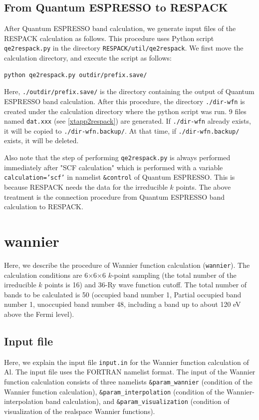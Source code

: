 \documentclass{article}
\begin{document}
\subsection{From {\sc Quantum ESPRESSO} to RESPACK}
After {\sc Quantum ESPRESSO} band calculation, we generate input files of the RESPACK calculation as follows. This procedure uses Python script {\tt qe2respack.py} in the directory {\tt RESPACK/util/qe2respack}. We first move the calculation directory, and execute the script as follows: 
\begin{verbatim}
python qe2respack.py outdir/prefix.save/
\end{verbatim}
Here, \verb+./outdir/prefix.save/+ is the directory containing the output of {\sc Quantum ESPRESSO} band calculation. After this procedure, the directory {\tt ./dir-wfn} is created under the calculation directory where the python script was run. 9 files named \verb+dat.xxx+ (see \ref{xtapp2respack}) are generated. If {\tt ./dir-wfn} already exists, it will be copied to {\tt ./dir-wfn.backup/}. At that time, if {\tt ./dir-wfn.backup/} exists, it will be deleted.  

Also note that the step of performing {\tt qe2respack.py} is always performed immediately after "SCF calculation" which is performed with a variable {\tt calculation='scf'} in namelist {\tt \&control} of {\sc Quantum ESPRESSO}. This is because RESPACK needs the data for the irreducible $k$ points. The above treatment is the connection procedure from {\sc Quantum ESPRESSO} band calculation to RESPACK. 

\clearpage 

\section{\label{wannier}wannier}

Here, we describe the procedure of Wannier function calculation (\verb+wannier+). The calculation conditions are 6$\times$6$\times$6 $k$-point sampling (the total number of the irreducible $k$ points is 16) and 36-Ry wave function cutoff. The total number of bands to be calculated is 50 (occupied band number 1, Partial occupied band number 1, unoccupied band number 48, including a band up to about 120 eV above the Fermi level).
\vspace{-3mm}
\subsection{\label{input-wannier}Input file}
Here, we explain the input file \verb+input.in+ for the Wannier function calculation of Al. The input file uses the FORTRAN namelist format. The input of the Wannier function calculation consists of three namelists \verb+&param_wannier+ (condition of the Wannier function calculation), \verb+&param_interpolation+ (condition of the Wannier-interpolation band calculation), and \verb+&param_visualization+ (condition of visualization of the realspace Wannier functions).
\vspace{-3mm}
\end{document}
